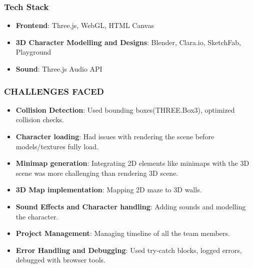 \documentclass[9pt]{beamer}
\begin{document}
\begin{frame}
\frametitle{Tech Stack}
\begin{itemize}
    \item \textbf{Frontend}: Three.js, WebGL, HTML Canvas
    \item \textbf{3D Character Modelling and Designs}: Blender, Clara.io, SketchFab, Playground
    \item \textbf{Sound}: Three.js Audio API
\end{itemize}
\end{frame}



\begin{frame}
    \frametitle{CHALLENGES FACED}
    \begin{itemize}
        \item \textbf{Collision Detection}: Used bounding boxes(THREE.Box3), optimized collision checks.
        \item \textbf{Character loading}: Had issues with rendering the scene before models/textures fully load.
        \item \textbf{Minimap generation}: Integrating 2D elements like minimaps with the 3D scene was more challenging than rendering 3D scene.
        \item \textbf{3D Map implementation}: Mapping 2D maze to 3D walls.
        \item \textbf{Sound Effects and Character handling}: Adding sounds and modelling the character.
        \item \textbf{Project Management}: Managing timeline of all the team members.
        \item \textbf{Error Handling and Debugging}: Used try-catch blocks, logged errors, debugged with browser tools.
    \end{itemize}
\end{frame}
\end{document}
